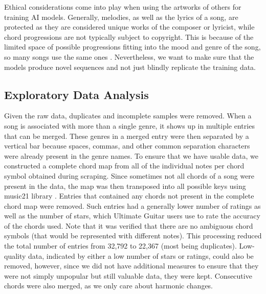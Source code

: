 \documentclass{article}
\begin{document}
Ethical considerations come into play when using the artworks of others for training AI models. Generally, melodies, as well as the lyrics of a song, are protected as they are considered unique works of the composer or lyricist, while chord progressions are not typically subject to copyright. This is because of the limited space of possible progressions fitting into the mood and genre of the song, so many songs use the same ones \cite{EasySong2023Copyright}. Nevertheless, we want to make sure that the models produce novel sequences and not just blindly replicate the training data.

\subsection{Exploratory Data Analysis} \label{EDA}

Given the raw data, duplicates and incomplete samples were removed. When a song is associated with more than a single genre, it shows up in multiple entries that can be merged. These genres in a merged entry were then separated by a vertical bar because spaces, commas, and other common separation characters were already present in the genre names. To ensure that we have usable data, we constructed a complete chord map from all of the individual notes per chord symbol obtained during scraping. Since sometimes not all chords of a song were present in the data, the map was then transposed into all possible keys using music21 library \cite{music21}. Entries that contained any chords not present in the complete chord map were removed. Such entries had a generally lower number of ratings as well as the number of stars, which Ultimate Guitar users use to rate the accuracy of the chords used. Note that it was verified that there are no ambiguous chord symbols (that would be represented with different notes). This processing reduced the total number of entries from 32,792 to 22,367 (most being duplicates). Low-quality data, indicated by either a low number of stars or ratings, could also be removed, however, since we did not have additional measures to ensure that they were not simply unpopular but still valuable data, they were kept. Consecutive chords were also merged, as we only care about harmonic changes.
\end{document}
